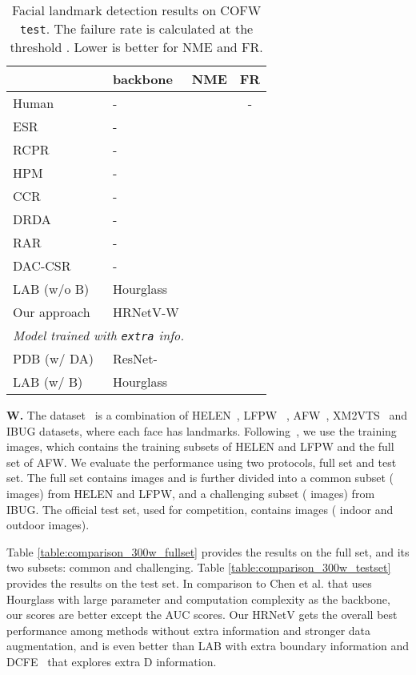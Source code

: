 \documentclass[10pt,twocolumn,letterpaper]{article}
\begin{document}
\renewcommand{\arraystretch}{1.3}
\begin{table}[t]
\setlength{\tabcolsep}{12.8pt}
\scriptsize
\centering
\caption{Facial landmark detection results on COFW \texttt{test}.
The failure rate is calculated at the threshold .
Lower is better for NME and FR.
}
\begin{tabular}{l|l|cc }
\hline\noalign{\smallskip}
 & backbone & NME & FR\\
\hline

\hline
Human & - &  & -\\
ESR \cite{CaoWWS12} &-&&\\
RCPR \cite{Burgos-ArtizzuPD13}& - & & \\
HPM \cite{GhiasiF14}& - & &  \\
CCR \cite{FengHKCW15}& -&  &  \\
DRDA \cite{ZhangKSC16}& - & &  \\
RAR \cite{XiaoFXLYK16}& - & &  \\
DAC-CSR \cite{FengKC0W17}& - & &  \\
LAB (w/o B) \cite{Wu0YWC018}& Hourglass &  & \\
\hline
Our approach & HRNetV-W &  &  \\
\hline

\hline
\multicolumn{3}{l}{
\emph {Model trained with \texttt{extra} info.}}\\
\hline
PDB (w/ DA)~\cite{FengKA0W18}& ResNet- &  & \\
LAB (w/ B)~\cite{Wu0YWC018}& Hourglass & &  \\
\hline
\end{tabular}
\label{table:comparison_cofw_testset}
\end{table}


\vspace{.1cm}
\noindent\textbf{W.}
The dataset~\cite{SagonasTZP13} is a combination
of HELEN~\cite{LeBLBH12}, LFPW ~\cite{BelhumeurJKK13}, AFW~\cite{ZhuR12}, XM2VTS~ and IBUG datasets,
where each face has  landmarks.
Following~\cite{RenCWS16}, we use the  training images, which
contains the training subsets of HELEN and LFPW and the full set of AFW.
We evaluate the performance
using two protocols, full set and test set.
The full set contains  images and is further divided
into a common subset ( images) from HELEN and LFPW, and a challenging subset
( images) from IBUG.
The official test set, used for competition,  contains  images ( indoor and  outdoor images).

Table \ref{table:comparison_300w_fullset}
provides the results
on the full set, and its two subsets:
common and challenging.
Table \ref{table:comparison_300w_testset} provides the results
on the test set.
In comparison to Chen et al. \cite{ChenSWLY17}
that uses Hourglass with large parameter and computation complexity
as the backbone,
our scores are better except the AUC scores.
Our HRNetV gets the overall
best performance among methods without extra information and stronger data augmentation, and is even better than LAB with extra boundary information and DCFE~\cite{ValleBVB18} that explores extra D information.
\end{document}

